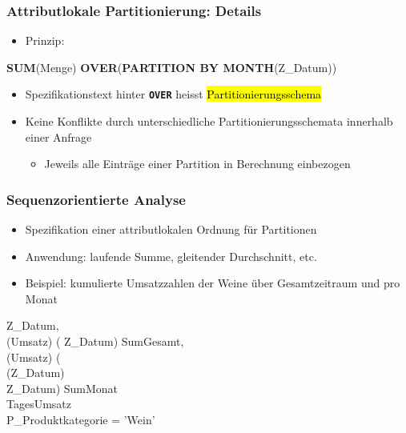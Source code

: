     
    \begin{frame}
    
    \frametitle{Attributlokale Partitionierung: Details}
    
    \begin{itemize}
    \item Prinzip:
    \end{itemize}
         \begin{sql}
    \textbf{SUM}(Menge) \textbf{OVER}(\textbf{PARTITION BY
          MONTH}(Z\_Datum))
      \end{sql}
      \begin{itemize}
    \item Spezifikationstext hinter \texttt{\textbf{OVER}} heisst \hl{
        Partitionierungsschema}
    \item Keine Konflikte durch unterschiedliche Partitionierungsschemata
      innerhalb einer Anfrage
      \begin{itemize}
      \item Jeweils alle Einträge einer Partition in Berechnung einbezogen
      \end{itemize}
    \end{itemize}
    
    \end{frame}
    
    
    \begin{frame}
    
    \frametitle{Sequenzorientierte Analyse}
    
    \begin{itemize}
    \item Spezifikation einer attributlokalen Ordnung für Partitionen
    \item Anwendung: laufende Summe, gleitender Durchschnitt, etc.
    \item Beispiel: kumulierte Umsatzzahlen der Weine über Gesamtzeitraum und pro
      Monat
    \end{itemize}
       \begin{sql}
     Z\_Datum,  \\
    \1 (Umsatz) ( Z\_Datum)  SumGesamt,\\
    \1 (Umsatz) (\\
    \3 (Z\_Datum)\\
    \3  Z\_Datum) 
    SumMonat \\
      TagesUmsatz\\
      P\_Produktkategorie = 'Wein'
      \end{sql}
    
    
    \end{frame}
    

